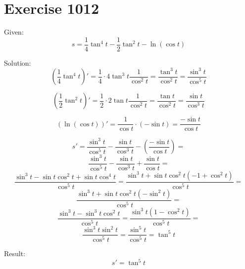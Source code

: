 \documentclass[a4paper, 10pt]{scrartcl}
\begin{document}
\section{Exercise 1012}

Given:
\[
s = \frac{1}{4}\tan^{4}{t} - \frac{1}{2}\tan^{2}{t} - \ln{(\cos{t})}
\]

Solution:
\[
(\frac{1}{4}\tan^{4}{t})' = \frac{1}{4}\cdot 4\tan^{3}{t}\frac{1}{\cos^{2}{t}} = \frac{\tan^{3}{t}}{\cos^{2}{t}} = \frac{\sin^{3}{t}}{\cos^{5}{t}}
\]

\[
(\frac{1}{2}\tan^{2}{t})' = \frac{1}{2}\cdot 2\tan{t}\frac{1}{\cos^{2}{t}} = \frac{\tan{t}}{\cos^{2}{t}} = \frac{\sin{t}}{\cos^{3}{t}}
\]

\[
(\ln{(\cos{t})})' = \frac{1}{\cos{t}}\cdot(-\sin{t}) = \frac{-\sin{t}}{\cos{t}}
\]

\[
s' = \frac{\sin^{3}{t}}{\cos^{5}{t}} - \frac{\sin{t}}{\cos^{3}{t}} - (\frac{-\sin{t}}{\cos{t}}) =
\]
\[
\frac{\sin^{3}{t}}{\cos^{5}{t}} - \frac{\sin{t}}{\cos^{3}{t}} + \frac{\sin{t}}{\cos{t}} =
\]
\[
\frac{\sin^{3}{t} - \sin{t}\cos^{2}{t} + \sin{t}\cos^{4}{t}}{\cos^{5}{t}} = \frac{\sin^{3}{t} + \sin{t}\cos^{2}{t}(-1 + \cos^{2}{t})}{\cos^{5}{t}} =
\]
\[
\frac{\sin^{3}{t} + \sin{t}\cos^{2}{t}(-\sin^{2}{t})}{\cos^{5}{t}} =
\]
\[
\frac{\sin^{3}{t} - \sin^{3}{t}\cos^{2}{t}}{\cos^{5}{t}} = \frac{\sin^{3}{t}(1 - \cos^{2}{t})}{\cos^{5}{t}} =
\]
\[
\frac{\sin^{3}{t}\sin^{2}{t}}{\cos^{5}{t}} = \frac{\sin^{5}{t}}{\cos^{5}{t}} = \tan^{5}{t}
\]

Result:
\[
s' = \tan^{5}{t}
\]
\end{document}
